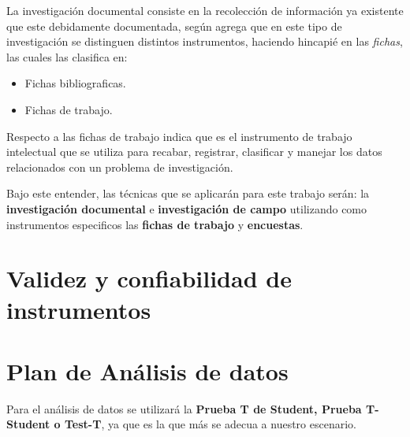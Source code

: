 La investigaci\'on documental consiste en la recolecci\'on de informaci\'on ya existente
que este debidamente documentada, seg\'un \cite{robledo} agrega que en este tipo
de investigaci\'on se distinguen distintos instrumentos, haciendo hincapi\'e en las
\emph{fichas}, las cuales \citep{robledo} las clasifica en:
\begin{itemize}
    \item Fichas bibliograficas.
    \item Fichas de trabajo.
\end{itemize}

Respecto a las fichas de trabajo \cite{robledo} indica que es el instrumento de
trabajo intelectual que se utiliza para recabar, registrar, clasificar y
manejar los datos relacionados con un problema de investigaci\'on.

Bajo este entender, las t\'ecnicas que se aplicar\'an para este trabajo ser\'an:
la \textbf{investigaci\'on documental} e \textbf{investigaci\'on de campo} utilizando
como instrumentos especificos las \textbf{fichas de trabajo} y \textbf{encuestas}.
\section{Validez y confiabilidad de instrumentos}

\section{Plan de An\'alisis de datos}
Para el an\'alisis de datos se utilizar\'a la \textbf{Prueba T de Student, Prueba
T-Student o Test-T}, ya que es la que m\'as se adecua a nuestro escenario.

